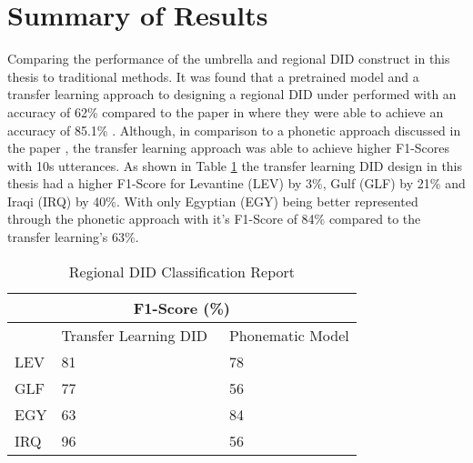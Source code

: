 \pagebreak 
\section{Summary of Results}\label{sect:sumResults}
Comparing the performance of the umbrella and regional DID construct in this thesis to traditional methods. 
It was found that a pretrained model and a transfer learning approach to designing a regional DID under performed with an accuracy of 62\% compared to the paper  \cite{lin_transformer-based_2020} in where they were able to achieve an accuracy of 85.1\% . 
Although, in comparison to a phonetic approach discussed in the paper \cite{biadsy_spoken_2009}, the transfer learning approach was able to achieve higher F1-Scores with 10s utterances. As shown in Table \ref{tab:comparision} the transfer learning DID 
design in this thesis had a higher F1-Score for Levantine (LEV) by 3\%, Gulf (GLF) by 21\% and Iraqi (IRQ) by 40\%. With only Egyptian (EGY) being better represented through the phonetic approach with it's F1-Score of 84\% compared to the 
transfer learning's 63\%. 

\begin{table}[h!]
    \centering
    \label{tab:comparision}
    \caption{Regional DID Classification Report}
    \begin{tabular}{|l|l|l|} 
    \hline
    \multicolumn{3}{|c|}{F1-Score (\%)}                 \\ 
    \hline
        & Transfer Learning DID~ & Phonematic Model \cite{biadsy_spoken_2009} \\ 
    \hline
    LEV & 81                     & 78                   \\ 
    \hline
    GLF & 77                     & 56                   \\ 
    \hline
    EGY & 63                     & 84                   \\ 
    \hline
    IRQ & 96                     & 56                   \\
    \hline
    \end{tabular}
    \end{table}

